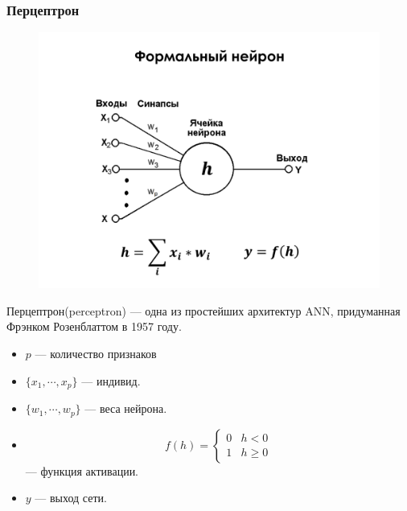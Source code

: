 \documentclass[11pt]{beamer}
\begin{document}
	\begin{frame}
		\frametitle{Перцептрон}
		
		\begin{figure} %
			\centering
			\includegraphics[width=1.2\linewidth]{../Report/imgs/math_neuron}
		\end{figure}
	
		Перцептрон(perceptron) --- одна из простейших архитектур ANN, придуманная Фрэнком Розенблаттом в 1957 году. \\
		
		
		\begin{itemize}
		\item $p$ --- количество признаков
		\item $\{ x_1, \cdots, x_p \}$ --- индивид. 
		\item $\{ w_1, \cdots, w_p \}$ --- веса нейрона. 
		\item \begin{equation*} 
			f(h) =  \begin{cases}
					0 & h < 0 \\
					1 & h \geqslant 0
					\end{cases}
		\end{equation*}
		--- функция активации. 
		\item $y$ --- выход сети.
		\end{itemize}
		
	
		
	\end{frame}

		
\end{document}
